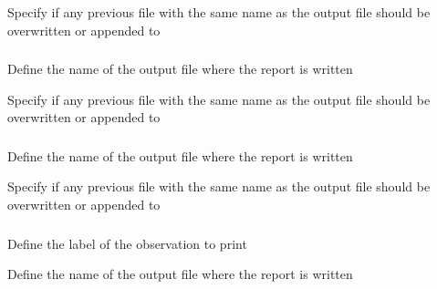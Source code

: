  {Specify if any previous file with the same name as the output file should be overwritten or appended to}

\subsubsection[Print the objective function values]{}

 {Define the name of the output file where the report is written}

 {Specify if any previous file with the same name as the output file should be overwritten or appended to}

\subsubsection[Print the covariance matrix]{}

 {Define the name of the output file where the report is written}

 {Specify if any previous file with the same name as the output file should be overwritten or appended to}

\subsubsection[Print a summary of the an observation, including fits, and residuals]{}

 {Define the label of the observation to print}

 {Define the name of the output file where the report is written}

